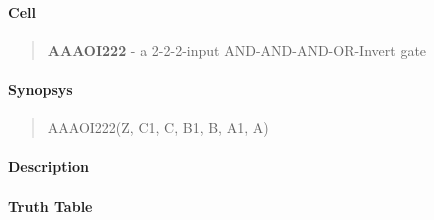 \label{AAAOI222}
\paragraph{Cell}
\begin{quote}
    \textbf{AAAOI222} - a 2-2-2-input AND-AND-AND-OR-Invert gate
\end{quote}

\paragraph{Synopsys}
\begin{quote}
    AAAOI222(Z, C1, C, B1, B, A1, A)
\end{quote}

\paragraph{Description}



\paragraph{Truth Table}


